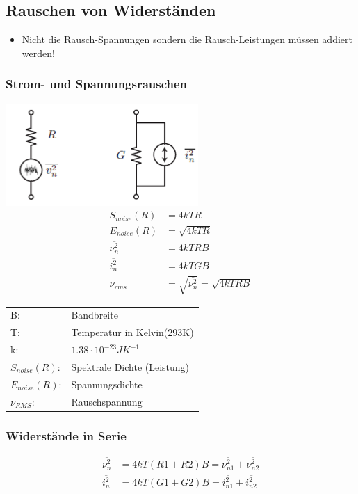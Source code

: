 \subsection{Rauschen von Widerständen}
\begin{itemize}
  \item Nicht die Rausch-Spannungen sondern die Rausch-Leistungen müssen addiert werden!
\end{itemize}
\subsubsection{Strom- und Spannungsrauschen}
\begin{multicols}{3}
	\includegraphics[scale=0.5]{pictures/widerstandrauschen}
	\columnbreak
	\begin{align*}
		S_{noise}(R) &=4kTR\\
		E_{noise}(R) &=\sqrt{4kTR}\\
		\overline{\nu^2_{n}} &=4kTRB\\
		\overline{i^2_{n}} &=4kTGB\\
		\nu_{rms} &= \sqrt{\overline{\nu^2_{n}}} = \sqrt{4kTRB}
	\end{align*}
	\begin{tabular}{ll}
		B:&Bandbreite\\
		T:&Temperatur in Kelvin(293K)\\
		k:&$1.38 \cdot 10^{-23}JK^{-1}$\\
		$S_{noise}(R)$:&Spektrale Dichte (Leistung)\\
		$E_{noise}(R)$:&Spannungsdichte\\
		$\nu_{RMS}$: & Rauschspannung\\
	\end{tabular}
\end{multicols}

\subsubsection{Widerstände in Serie}
\begin{minipage}{0.4\textwidth}
	\begin{center}
		
	\end{center}
\end{minipage}
\begin{minipage}{0.6\textwidth}
	\begin{align*}
		\overline{\nu^2_{n}}&=4kT(R1+R2)B=\overline{\nu^2_{n1}}+\overline{\nu^2_{n2}}\\
		\overline{i^2_{n}}&=4kT(G1+G2)B=\overline{i^2_{n1}}+\overline{i^2_{n2}}
	\end{align*}
\end{minipage}

